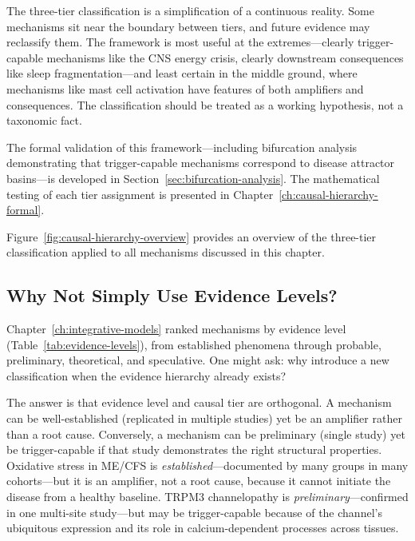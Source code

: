 \begin{limitation}
The three-tier classification is a simplification of a continuous reality. Some mechanisms sit near the boundary between tiers, and future evidence may reclassify them. The framework is most useful at the extremes---clearly trigger-capable mechanisms like the CNS energy crisis, clearly downstream consequences like sleep fragmentation---and least certain in the middle ground, where mechanisms like mast cell activation have features of both amplifiers and consequences. The classification should be treated as a working hypothesis, not a taxonomic fact.
\end{limitation}

The formal validation of this framework---including bifurcation analysis demonstrating that trigger-capable mechanisms correspond to disease attractor basins---is developed in Section~\ref{sec:bifurcation-analysis}. The mathematical testing of each tier assignment is presented in Chapter~\ref{ch:causal-hierarchy-formal}.

Figure~\ref{fig:causal-hierarchy-overview} provides an overview of the three-tier classification applied to all mechanisms discussed in this chapter.




\subsection{Why Not Simply Use Evidence Levels?}
\label{sec:why-not-evidence-levels}

Chapter~\ref{ch:integrative-models} ranked mechanisms by evidence level (Table~\ref{tab:evidence-levels}), from established phenomena through probable, preliminary, theoretical, and speculative. One might ask: why introduce a new classification when the evidence hierarchy already exists?

The answer is that evidence level and causal tier are orthogonal. A mechanism can be well-established (replicated in multiple studies) yet be an amplifier rather than a root cause. Conversely, a mechanism can be preliminary (single study) yet be trigger-capable if that study demonstrates the right structural properties. Oxidative stress in ME/CFS is \emph{established}---documented by many groups in many cohorts---but it is an amplifier, not a root cause, because it cannot initiate the disease from a healthy baseline. TRPM3 channelopathy is \emph{preliminary}---confirmed in one multi-site study---but may be trigger-capable because of the channel's ubiquitous expression and its role in calcium-dependent processes across tissues.

